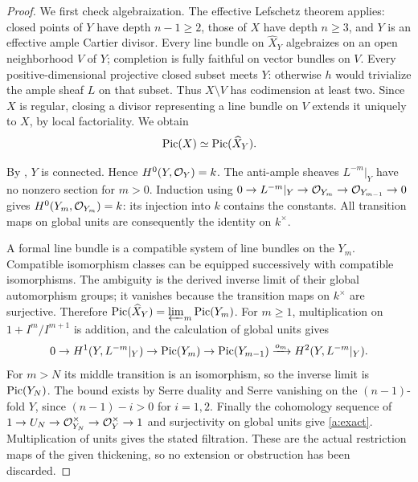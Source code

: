\begin{proof}
We first check algebraization.  The effective Lefschetz theorem
\cite[Expos\'e XII, Corollary 3.4, pp.~119--120]{SGA2} applies: closed
points of $Y$ have depth $n-1\geq2$, those of $X$ have depth $n\geq3$,
and $Y$ is an effective ample Cartier divisor.  Every line bundle on
$\widehat X_Y$ algebraizes on an open neighborhood $V$ of $Y$;
completion is fully faithful on vector bundles on $V$.
Every positive-dimensional projective closed subset meets $Y$: otherwise
$h$ would trivialize the ample sheaf $L$ on that subset.  Thus
$X\setminus V$ has codimension at least two.  Since $X$ is regular,
closing a divisor representing a line bundle on $V$ extends it uniquely
to $X$, by local factoriality.  We obtain
\begin{equation}\label{a:formal}
 \operatorname{Pic}(X)\simeq\operatorname{Pic}(\widehat X_Y).
\end{equation}

By \cite[Expos\'e XII, Corollary 3.5, p.~120]{SGA2}, $Y$ is connected.
Hence $H^0(Y,\mathcal O_Y)=k$.  The anti-ample sheaves $L^{-m}|_Y$ have no
nonzero section for $m>0$.  Induction using
$0\to L^{-m}|_Y\to\mathcal O_{Y_m}\to\mathcal O_{Y_{m-1}}\to0$ gives
$H^0(Y_m,\mathcal O_{Y_m})=k$: its injection into $k$ contains the constants.
All transition maps on global units are consequently the identity on
$k^\times$.

A formal line bundle is a compatible system of line bundles on the $Y_m$.
Compatible isomorphism classes can be equipped successively with
compatible isomorphisms.  The ambiguity is the derived inverse limit of
their global automorphism groups; it vanishes because the transition maps
on $k^\times$ are surjective.  Therefore
$\operatorname{Pic}(\widehat X_Y)=\varprojlim_m\operatorname{Pic}(Y_m)$.
For $m\geq1$, multiplication on $1+I^m/I^{m+1}$ is addition, and the
calculation of global units gives
\begin{equation}\label{a:layer}
 0\to H^1(Y,L^{-m}|_Y)\to\operatorname{Pic}(Y_m)\to\operatorname{Pic}(Y_{m-1})
       \xrightarrow{o_m}H^2(Y,L^{-m}|_Y).
\end{equation}
For $m>N$ its middle transition is an isomorphism, so the inverse limit
is $\operatorname{Pic}(Y_N)$.  The bound exists by Serre duality and Serre vanishing
on the $(n-1)$-fold $Y$, since $(n-1)-i>0$ for $i=1,2$.
Finally the cohomology sequence of
$1\to U_N\to\mathcal O_{Y_N}^{\times}\to\mathcal O_Y^{\times}\to1$ and
surjectivity on global units give \eqref{a:exact}.  Multiplication of units
gives the stated filtration.  These are the actual restriction maps of
the given thickening, so no extension or obstruction has been discarded.
\end{proof}

